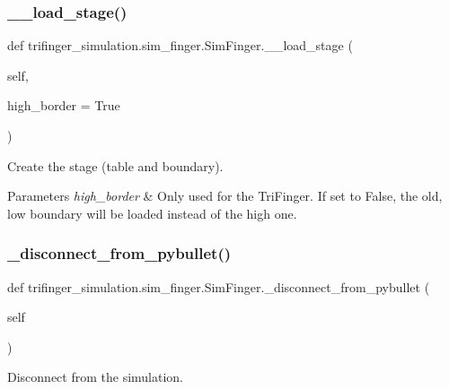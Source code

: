 \subsubsection{\texorpdfstring{\+\_\+\+\_\+load\+\_\+stage()}{\_\_load\_stage()}}
{\footnotesize\ttfamily def trifinger\+\_\+simulation.\+sim\+\_\+finger.\+Sim\+Finger.\+\_\+\+\_\+load\+\_\+stage (\begin{DoxyParamCaption}\item[{}]{self,  }\item[{}]{high\+\_\+border = {\ttfamily True} }\end{DoxyParamCaption})\hspace{0.3cm}{\ttfamily [private]}}



Create the stage (table and boundary). 


\begin{DoxyParams}{Parameters}
{\em high\+\_\+border} & Only used for the Tri\+Finger. If set to False, the old, low boundary will be loaded instead of the high one. \\
\hline
\end{DoxyParams}
\mbox{\label{classtrifinger__simulation_1_1sim__finger_1_1SimFinger_a946035313313f8068a568360f53cfa48}} 
\subsubsection{\texorpdfstring{\+\_\+disconnect\+\_\+from\+\_\+pybullet()}{\_disconnect\_from\_pybullet()}}
{\footnotesize\ttfamily def trifinger\+\_\+simulation.\+sim\+\_\+finger.\+Sim\+Finger.\+\_\+disconnect\+\_\+from\+\_\+pybullet (\begin{DoxyParamCaption}\item[{}]{self }\end{DoxyParamCaption})\hspace{0.3cm}{\ttfamily [private]}}



Disconnect from the simulation. 

